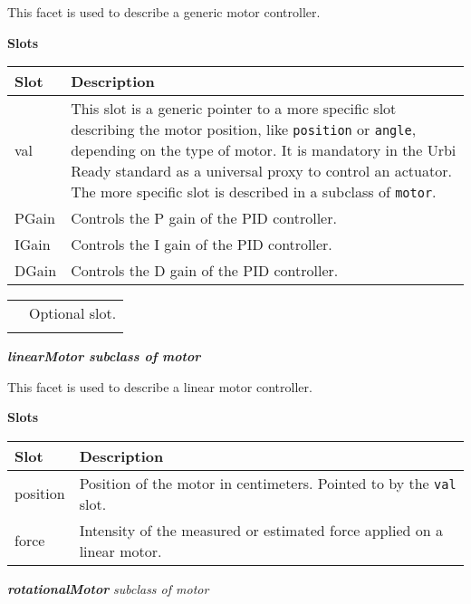 \documentclass[a4paper]{article}
\begin{document}
{\sffamily
This facet is used to describe a generic motor controller.}

{\sffamily\bfseries
Slots}

\begin{flushleft}
\tablehead{}
\begin{supertabular}{|m{2.8669999cm}|m{12.422cm}|}
\hline
{}\sffamily\bfseries Slot &
\sffamily\bfseries Description\\\hline
{} val &
\sffamily This slot is a generic pointer to a
more specific slot describing the motor position, like
\texttt{position} or \texttt{angle}, depending on the type of motor. It
is mandatory in the Urbi Ready standard as a universal proxy to control
an actuator. The more specific slot is described in a subclass of
\texttt{motor}.\\\hline
{} PGain &
\sffamily Controls the P gain of the PID
controller.\\\hline
{} IGain &
\sffamily Controls the I gain of the PID
controller.\\\hline
{} DGain &
\sffamily Controls the D gain of the PID
controller.\\\hline
\end{supertabular}
\end{flushleft}
\begin{flushleft}
\tablehead{}
\begin{supertabular}{|m{1.717cm}|m{10.464cm}}
\hhline{-~}
 &
\sffamily Optional slot.\\\hhline{-~}
\end{supertabular}
\end{flushleft}
{\sffamily\bfseries\itshape
 linearMotor  \textmd{subclass of motor}}

{\sffamily
This facet is used to describe a linear motor controller.}

{\sffamily\bfseries
Slots}

\begin{flushleft}
\tablehead{}
\begin{supertabular}{|m{2.8669999cm}|m{12.422cm}|}
\hline
{}\sffamily\bfseries Slot &
\sffamily\bfseries Description\\\hline
{} position &
\sffamily Position of the motor in centimeters.
Pointed to by the \texttt{val} slot.\\\hline
{} force &
\sffamily Intensity of the measured or estimated
force applied on a linear motor.\\\hline
\end{supertabular}
\end{flushleft}
{
     \textsf{\textbf{\textit{rotationalMotor}}} 
\textsf{\textit{subclass of motor}}}
\end{document}
